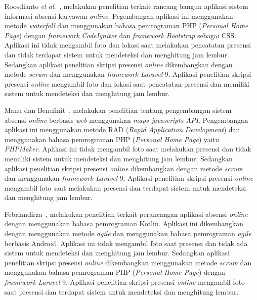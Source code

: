 Roosdianto \textit{et al}.~\cite{roosdianto2021rancang}, melakukan penelitian terkait rancang bangun aplikasi sistem informasi absensi karyawan \textit{online}. Pegembangan aplikasi ini menggunakan metode \textit{waterfall} dan menggunakan bahasa pemrograman PHP (\textit{Personal Home Page}) dengan \textit{framework CodeIgniter} dan \textit{framework Bootstrap} sebagai CSS. Aplikasi ini tidak mengambil foto dan lokasi saat melakukan pencatatan presensi dan tidak terdapat sistem untuk mendeteksi dan menghitung jam lembur. Sedangkan aplikasi penelitian skripsi presensi \textit{online} dikembangkan dengan metode \textit{scrum} dan menggunakan \textit{framework Laravel} 9. Aplikasi penelitian skripsi presensi \textit{online} mengambil foto dan lokasi saat pencatatan presensi dan memiliki sistem untuk mendeteksi dan menghitung jam lembur.

Manu dan Benufinit~\cite{manu2020pengembangan}, melakukan penelitian tentang pengembangan sistem absensi \textit{online} berbasis \textit{web} menggunakan \textit{maps javascripts API}. Pengembangan aplikasi ini menggunakan metode RAD (\textit{Rapid Application Development}) dan menggunakan bahasa pemrograman PHP (\textit{Personal Home Page}) yaitu \textit{PHPMaker}. Aplikasi ini tidak mengambil foto saat melakukan presensi dan tidak memiliki sistem untuk mendeteksi dan menghitung jam lembur. Sedangkan aplikasi penelitian skripsi presensi \textit{online} dikembangkan dengan metode \textit{scrum} dan menggunakan \textit{framework Laravel} 9. Aplikasi penelitian skripsi presensi \textit{online} mengambil foto saat melakukan presensi dan terdapat sistem untuk mendeteksi dan menghitung jam lembur. 

Febriandirza~\cite{febriandirza2020perancangan}, melakukan penelitian terkait perancangan aplikasi absensi \textit{online} dengan menggunakan bahasa pemrograman Kotlin. Aplikasi ini dikembangkan dengan menggunakan metode \textit{agile} dan menggunakan bahasa pemrograman \textit{agile} berbasis Android. Aplikasi ini tidak mengambil foto saat presensi dan tidak ada sistem untuk mendeteksi dan menghitung jam lembur. Sedangkan aplikasi penelitian skripsi presensi \textit{online} dikembangkan menggunakan metode \textit{scrum} dan menggunakan bahasa pemrograman PHP (\textit{Personal Home Page}) dengan \textit{framework Laravel} 9. Aplikasi penelitian skripsi presensi \textit{online} mengambil foto saat presensi dan terdapat sistem untuk mendeteksi dan menghitung lembur.

